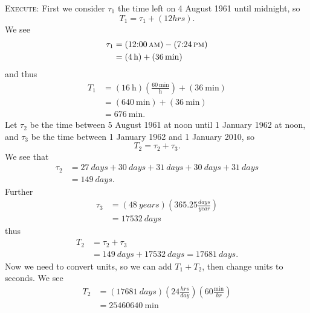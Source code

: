 \textsc{Execute:}
First we consider $\tau_{1}$ the time left on 4 August 1961 until
midnight, so
\begin{equation}
T_{1} = \tau_{1} + (12\si{hrs}).
\end{equation}
We see
\begin{subequations}
\begin{align}
\tau_{1} &= (\mbox{12:00\thinspace\sc
am})-(\mbox{7:24\thinspace\sc pm})\\
&=(\SI{4}{\hour})+(\SI{36}{\minute})
\end{align}
\end{subequations}
and thus
\begin{subequations}
\begin{align}
T_{1} &= (\SI{16}{\hour})\left(\frac{\SI{60}{\minute}}{\si{\hour}}\right)+
(\SI{36}{\minute})\\
&=(\SI{640}{\minute})+(\SI{36}{\minute})\\
&=\SI{676}{\minute}.
\end{align}
\end{subequations}
Let $\tau_{2}$ be the time between 5 August 1961 at noon until 1
January 1962 at noon, and $\tau_{3}$ be the time between 1
January 1962 and 1 January 2010, so
\begin{equation}
T_{2} = \tau_2+\tau_3.
\end{equation}
We see that
\begin{subequations}
\begin{align}
\tau_2 &= \SI{27}{days}+\SI{30}{days}+\SI{31}{days}+
\SI{30}{days}+\SI{31}{days}\\
&=\SI{149}{days}.
\end{align}
\end{subequations}
Further
\begin{subequations}
\begin{align}
\tau_3 &=
(\SI{48}{years})\left(365.25\frac{\si{days}}{\si{year}}\right)\\
&=\SI{17532}{days}
\end{align}
\end{subequations}
thus
\begin{equation}
\begin{split}
T_{2} &= \tau_2+\tau_3\\
&=\SI{149}{days}+\SI{17532}{days}=\SI{17681}{days}.
\end{split}
\end{equation}
Now we need to convert units, so we can add $T_1+T_2$, then
change units to seconds. We see
\begin{equation}
\begin{split}
T_{2} &=
(\SI{17681}{days})\left(24\frac{\si{hrs}}{\si{day}}\right)
\left(60\frac{\si{\minute}}{\si{hr}}\right)\\
&= \SI{25460640}{\minute}
\end{split}
\end{equation}
